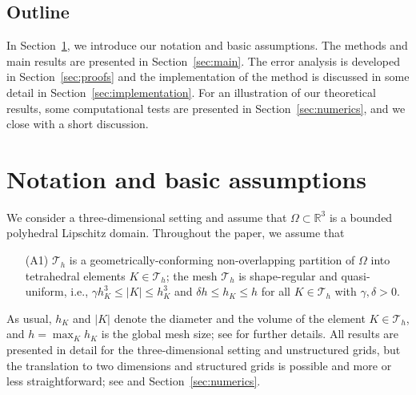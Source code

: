\documentclass[12pt,reqno,a4paper]{amsart}
\theoremstyle{definition}
\def\Th{\mathcal{T}_h}
\def\K{K}
\def\Th{\mathcal{T}_h}
\def\RR{\mathbb{R}}
\begin{document}
\subsection*{Outline}

In Section~\ref{sec:prelim}, we introduce our notation and basic assumptions. 
The methods and main results are presented in Section~\ref{sec:main}. 
The error analysis is developed in Section~\ref{sec:proofs} and the implementation of the method is discussed in some detail in Section~\ref{sec:implementation}.
For an illustration of our theoretical results, some computational tests are presented in Section~\ref{sec:numerics}, and we close with a short discussion.



\section{Notation and basic assumptions} 
\label{sec:prelim}

We consider a three-dimensional setting and assume that $\Omega \subset \RR^3$ is a bounded polyhedral Lipschitz domain.
Throughout the paper, we assume that 
\begin{enumerate}[topsep=1em]
\item [(A1)] %
$\Th$ is a geometrically-conforming non-overlapping partition of $\Omega$ into tetrahedral elements $\K \in \Th$; the mesh $\Th$ is shape-regular and quasi-uniform, i.e., $\gamma h_\K^3 \le |\K| \le h_\K^3$ and $\delta h \le h_\K \le h$ for all $\K \in \Th$ with $\gamma,\delta>0$. 
\end{enumerate}
As usual, $h_\K$ and $|\K|$ denote the diameter and the volume of the element $\K \in \Th$, and $h=\max_\K h_\K$ is the global mesh size; see \cite{ErnGuermond} for further details.
All results are presented in detail for the three-dimensional setting and unstructured grids, but the translation to two dimensions and structured grids is possible and more or less straightforward; see \cite[Chapter 5]{Radu22} and Section~\ref{sec:numerics}.
\end{document}
